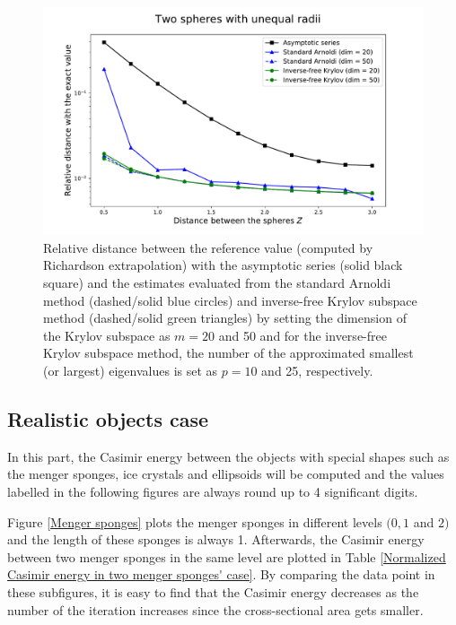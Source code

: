 \begin{figure}[H]
    \includegraphics[scale = 0.7]{figures/relative_distance_unequal_radii.pdf}
    \caption{Relative distance between the reference value (computed by Richardson extrapolation) with the asymptotic series (solid black square)  
    and the estimates evaluated from the standard Arnoldi method (dashed/solid blue circles) and inverse-free Krylov subspace method (dashed/solid green triangles) 
    by setting the dimension of the Krylov subspace as $m = 20$ and 50 and for the inverse-free
    Krylov subspace method, the number of the approximated smallest (or largest) eigenvalues is set as $p = 10$ and 25, respectively.}
    \label{unequal_radii_rel_dist}
\end{figure}

\subsection{Realistic objects case}
In this part, the Casimir energy between the objects with special shapes such as the menger sponges, ice crystals and ellipsoids will be computed and 
the values labelled in the following figures are always round up to 4 significant digits. 

Figure \ref{Menger sponges} plots the menger sponges in different levels $(0, 1 $ and $ 2)$ and the length of these sponges is always 1. Afterwards, the Casimir 
energy between two menger sponges in the same level are plotted in Table \ref{Normalized Casimir energy in two menger sponges' case}. By comparing the data 
point in these subfigures, it is easy to find that the Casimir energy decreases as the number of the iteration increases since the cross-sectional 
area gets smaller.

